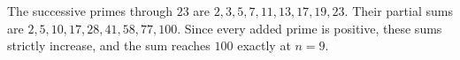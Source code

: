 The successive primes through $23$ are $2,3,5,7,11,13,17,19,23$. Their partial sums are $2,5,10,17,28,41,58,77,100$. Since every added prime is positive, these sums strictly increase, and the sum reaches $100$ exactly at $\boxed{n=9}$.
